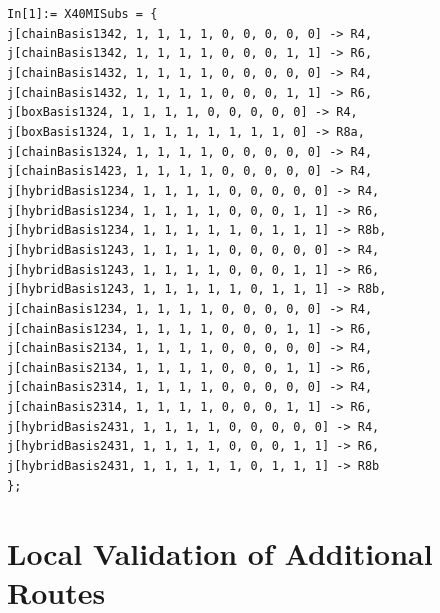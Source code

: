 \begin{mdframed}[backgroundcolor=gray!10, linewidth=0pt]
\texttt{In[1]:= X40MISubs = \{\\
   j[chainBasis1342, 1, 1, 1, 1, 0, 0, 0, 0, 0] -> R4,\\
   j[chainBasis1342, 1, 1, 1, 1, 0, 0, 0, 1, 1] -> R6,\\
   j[chainBasis1432, 1, 1, 1, 1, 0, 0, 0, 0, 0] -> R4,\\
   j[chainBasis1432, 1, 1, 1, 1, 0, 0, 0, 1, 1] -> R6,\\
   j[boxBasis1324, 1, 1, 1, 1, 0, 0, 0, 0, 0] -> R4,\\
   j[boxBasis1324, 1, 1, 1, 1, 1, 1, 1, 1, 0] -> R8a,\\
   j[chainBasis1324, 1, 1, 1, 1, 0, 0, 0, 0, 0] -> R4,\\
   j[chainBasis1423, 1, 1, 1, 1, 0, 0, 0, 0, 0] -> R4,\\
   j[hybridBasis1234, 1, 1, 1, 1, 0, 0, 0, 0, 0] -> R4,\\
   j[hybridBasis1234, 1, 1, 1, 1, 0, 0, 0, 1, 1] -> R6,\\
   j[hybridBasis1234, 1, 1, 1, 1, 1, 0, 1, 1, 1] -> R8b,\\
   j[hybridBasis1243, 1, 1, 1, 1, 0, 0, 0, 0, 0] -> R4,\\
   j[hybridBasis1243, 1, 1, 1, 1, 0, 0, 0, 1, 1] -> R6,\\
   j[hybridBasis1243, 1, 1, 1, 1, 1, 0, 1, 1, 1] -> R8b,\\
   j[chainBasis1234, 1, 1, 1, 1, 0, 0, 0, 0, 0] -> R4,\\
   j[chainBasis1234, 1, 1, 1, 1, 0, 0, 0, 1, 1] -> R6,\\
   j[chainBasis2134, 1, 1, 1, 1, 0, 0, 0, 0, 0] -> R4,\\
   j[chainBasis2134, 1, 1, 1, 1, 0, 0, 0, 1, 1] -> R6,\\
   j[chainBasis2314, 1, 1, 1, 1, 0, 0, 0, 0, 0] -> R4,\\
   j[chainBasis2314, 1, 1, 1, 1, 0, 0, 0, 1, 1] -> R6,\\
   j[hybridBasis2431, 1, 1, 1, 1, 0, 0, 0, 0, 0] -> R4,\\
   j[hybridBasis2431, 1, 1, 1, 1, 0, 0, 0, 1, 1] -> R6,\\
   j[hybridBasis2431, 1, 1, 1, 1, 1, 0, 1, 1, 1] -> R8b\\
   \};}
\end{mdframed}

\section{Local Validation of Additional Routes}\label{sec:localValidationExtra}

